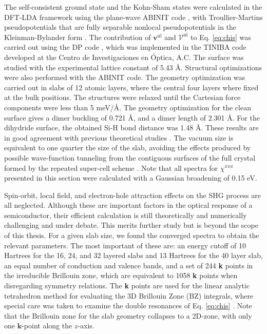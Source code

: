 The self-consistent ground state and the Kohn-Sham states were calculated in the
DFT-LDA framework using the plane-wave ABINIT code \cite{gonzeCPS09, abinit},
with Troullier-Martins pseudopotentials \cite{troullierPRB91} that are fully
separable nonlocal pseudopotentials in the Kleinman-Bylander form
\cite{kleinmanPRL82}. The contribution of $\mathbf{v}^\mathrm{nl}$ and
$\boldsymbol{\mathcal{V}}^\mathrm{nl}$ to Eq. \eqref{eq:chis} was carried out
using the DP code \cite{olevanoDP}, which was implemented in the TINIBA code
\cite{tiniba} developed at the Centro de Investigaciones en \'Optica, A.C. The
surface was studied with the experimental lattice constant of 5.43 \AA.
Structural optimizations were also performed with the ABINIT code. The geometry
optimization was carried out in slabs of 12 atomic layers, where the central
four layers where fixed at the bulk positions. The structures were relaxed until
the Cartesian force components were less than 5 meV/\AA. The geometry
optimization for the clean surface gives a dimer buckling of 0.721 \AA, and a
dimer length of 2.301 \AA. For the dihydride surface, the obtained Si-H bond
distance was 1.48 \AA. These results are in good agreement with previous
theoretical studies \cite{caramellaPRB09, mendozaPRB06}. The vacuum size is
equivalent to one quarter the size of the slab, avoiding the effects produced by
possible wave-function tunneling from the contiguous surfaces of the full
crystal formed by the repeated super-cell scheme \cite{mendozaPRB06}. Note that
all spectra for $\chi^{xxx}$ presented in this section were calculated with a
Gaussian broadening of 0.15 eV.

Spin-orbit, local field, and electron-hole attraction \cite{beyond} effects on
the SHG process are all neglected. Although these are important factors in the
optical response of a semiconductor, their efficient calculation is still
theoretically and numerically challenging and under debate. This merits further
study but is beyond the scope of this thesis. For a given slab size, we found
the converged spectra to obtain the relevant parameters. The most important of
these are: an energy cutoff of 10 Hartrees for the 16, 24, and 32 layered slabs
and 13 Hartrees for the 40 layer slab, an equal number of conduction and valence
bands, and a set of 244 \textbf{k} points in the irreducible Brillouin zone,
which are equivalent to 1058 \textbf{k} points when disregarding symmetry
relations. The \textbf{k} points are used for the linear analytic tetrahedron
method for evaluating the 3D Brillouin Zone (BZ) integrals, where special care
was taken to examine the double resonances of Eq. \eqref{eq:chis}
\cite{nastosPRB05}. Note that the Brillouin zone for the slab geometry collapses
to a 2D-zone, with only one $\mathbf{k}$-point along the $z$-axis.


